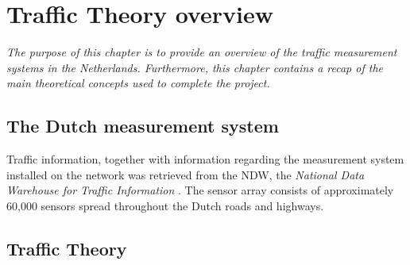 \chapter{Traffic Theory overview}

\textit{The purpose of this chapter is to provide an overview of the traffic measurement systems in the Netherlands. Furthermore, this chapter contains a recap of the main theoretical concepts used to complete the project.}

\bigskip

\section{The Dutch measurement system}
Traffic information, together with information regarding the measurement system installed on the network was retrieved from the NDW, the \textit{National Data Warehouse for Traffic Information} \cite{ndw}. The sensor array consists of approximately 60,000 sensors spread throughout the Dutch roads and highways. 


\section{Traffic Theory}



